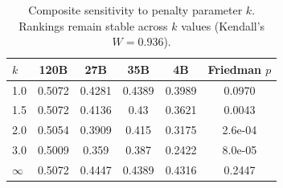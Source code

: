 \begin{table}[t]
\centering
\caption{Composite sensitivity to penalty parameter $k$. Rankings remain stable across $k$ values (Kendall's $W = 0.936$).}
\label{tab:k_sensitivity}
\small
\begin{tabular}{lccccc}
\toprule
\textbf{$k$} & \textbf{120B} & \textbf{27B} & \textbf{35B} & \textbf{4B} & \textbf{Friedman $p$} \\
\midrule
1.0 & 0.5072 & 0.4281 & 0.4389 & 0.3989 & 0.0970 \\
1.5 & 0.5072 & 0.4136 & 0.43 & 0.3621 & 0.0043 \\
2.0 & 0.5054 & 0.3909 & 0.415 & 0.3175 & 2.6e-04 \\
3.0 & 0.5009 & 0.359 & 0.387 & 0.2422 & 8.0e-05 \\
$\infty$ & 0.5072 & 0.4447 & 0.4389 & 0.4316 & 0.2447 \\
\bottomrule
\end{tabular}
\end{table}